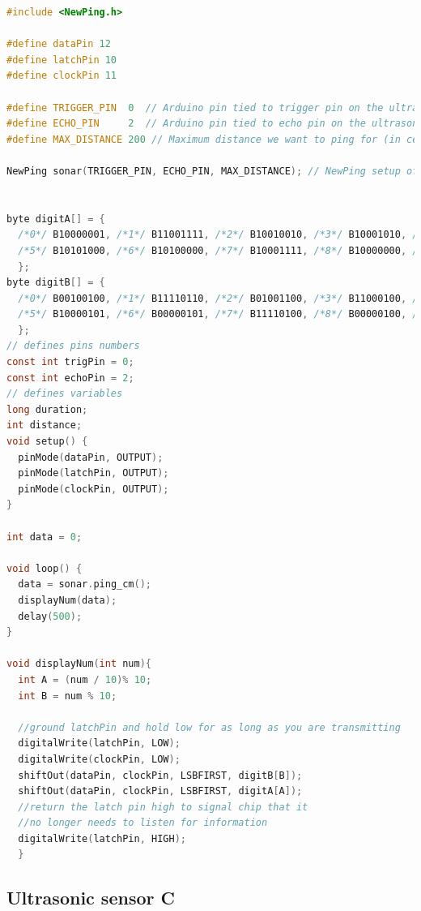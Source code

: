   \begin{lstlisting}[language=c,caption={Sensor testing code B},label={lst:sensor_test_b}]
#include <NewPing.h>

#define dataPin 12
#define latchPin 10
#define clockPin 11

#define TRIGGER_PIN  0  // Arduino pin tied to trigger pin on the ultrasonic sensor.
#define ECHO_PIN     2  // Arduino pin tied to echo pin on the ultrasonic sensor.
#define MAX_DISTANCE 200 // Maximum distance we want to ping for (in centimeters). Maximum sensor distance is rated at 400-500cm.

NewPing sonar(TRIGGER_PIN, ECHO_PIN, MAX_DISTANCE); // NewPing setup of pins and maximum distance.


byte digitA[] = {
  /*0*/ B10000001, /*1*/ B11001111, /*2*/ B10010010, /*3*/ B10001010, /*4*/ B11001100,
  /*5*/ B10101000, /*6*/ B10100000, /*7*/ B10001111, /*8*/ B10000000, /*9*/ B10001000,
  };
byte digitB[] = {
  /*0*/ B00100100, /*1*/ B11110110, /*2*/ B01001100, /*3*/ B11000100, /*4*/ B10010110,
  /*5*/ B10000101, /*6*/ B00000101, /*7*/ B11110100, /*8*/ B00000100, /*9*/ B10000100
  };
// defines pins numbers
const int trigPin = 0;
const int echoPin = 2;
// defines variables
long duration;
int distance;
void setup() {
  pinMode(dataPin, OUTPUT);
  pinMode(latchPin, OUTPUT);
  pinMode(clockPin, OUTPUT);
}

int data = 0;

void loop() {
  data = sonar.ping_cm();
  displayNum(data);
  delay(500);
}

void displayNum(int num){
  int A = (num / 10)% 10; 
  int B = num % 10;

  //ground latchPin and hold low for as long as you are transmitting
  digitalWrite(latchPin, LOW);
  digitalWrite(clockPin, LOW);
  shiftOut(dataPin, clockPin, LSBFIRST, digitB[B]);
  shiftOut(dataPin, clockPin, LSBFIRST, digitA[A]);
  //return the latch pin high to signal chip that it
  //no longer needs to listen for information
  digitalWrite(latchPin, HIGH);
  }
\end{lstlisting}

\subsection*{Ultrasonic sensor C}

